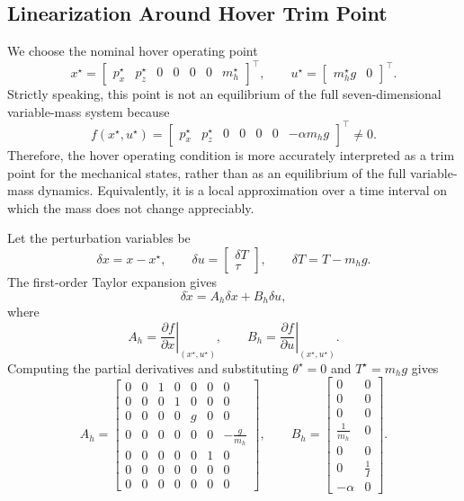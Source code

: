
\subsection{Linearization Around Hover Trim Point}
\label{subsec:hover_linearization}


We choose the nominal hover operating point
\[
    x^\star =
    \begin{bmatrix}
        p_x^\star & p_z^\star & 0 & 0 & 0 & 0 & m_h^\star
    \end{bmatrix}^\top,
    \qquad
    u^\star =
    \begin{bmatrix}
        m_h^{\star} g & 0
    \end{bmatrix}^\top.
\]
Strictly speaking, this point is not an equilibrium of the full seven-dimensional variable-mass system because
\[
    f(x^\star,u^\star)
    =
    \begin{bmatrix}
        p_x^\star & p_z^\star & 0 & 0 & 0 & 0 & -\alpha m_h g
    \end{bmatrix}^\top
    \neq 0.
\]
Therefore, the hover operating condition is more accurately interpreted as a trim point for the mechanical states, rather than as an equilibrium of the full variable-mass dynamics. Equivalently, it is a local approximation over a time interval on which the mass does not change appreciably.

Let the perturbation variables be
\[
    \delta x = x-x^\star,
    \qquad
    \delta u =
    \begin{bmatrix}
        \delta T \\
        \tau
    \end{bmatrix},
    \qquad
    \delta T = T-m_hg.
\]
The first-order Taylor expansion gives
\[
    \delta \dot x
    = A_h \delta x + B_h \delta u,
\]
where
\[
    A_h = \left.\frac{\partial f}{\partial x}\right|_{(x^\star,u^\star)},
    \qquad
    B_h = \left.\frac{\partial f}{\partial u}\right|_{(x^\star,u^\star)}.
\]
Computing the partial derivatives and substituting $\theta^\star=0$ and $T^\star=m_hg$ gives
\[
A_h =
\begin{bmatrix}
0 & 0 & 1 & 0 & 0 & 0 & 0 \\
0 & 0 & 0 & 1 & 0 & 0 & 0 \\
0 & 0 & 0 & 0 & g & 0 & 0 \\
0 & 0 & 0 & 0 & 0 & 0 & -\frac{g}{m_h} \\
0 & 0 & 0 & 0 & 0 & 1 & 0 \\
0 & 0 & 0 & 0 & 0 & 0 & 0 \\
0 & 0 & 0 & 0 & 0 & 0 & 0
\end{bmatrix},
\qquad
B_h =
\begin{bmatrix}
0 & 0 \\
0 & 0 \\
0 & 0 \\
\frac{1}{m_h} & 0 \\
0 & 0 \\
0 & \frac{1}{I} \\
-\alpha & 0
\end{bmatrix}.
\]

